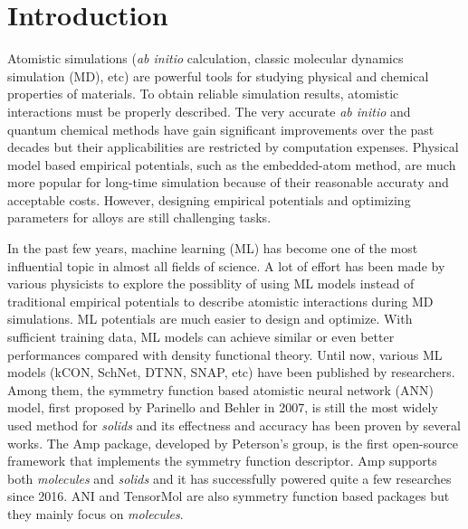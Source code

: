 \documentclass[prb,preprint]{revtex4-2}
\begin{document}
% 
%
\newpage

\section{Introduction}

Atomistic simulations (\textit{ab initio} calculation, classic molecular 
dynamics simulation (MD), etc) are powerful tools for studying physical and 
chemical properties of materials. To obtain reliable simulation results, 
atomistic interactions must be properly described. The very accurate 
\textit{ab initio} and quantum chemical methods have gain significant 
improvements over the past decades but their applicabilities are restricted by 
computation expenses. Physical model based empirical potentials, such as the 
embedded-atom method\cite{eam-1,eam-2,eam-3,eam-4,eam-5}, are much more popular 
for long-time simulation because of their reasonable accuraty and acceptable 
costs. However, designing empirical potentials and optimizing parameters for 
alloys are still challenging tasks. 

In the past few years, machine learning (ML) has become one of the most 
influential topic in almost all fields of science. A lot of effort has been made 
by various physicists to explore the possiblity of using ML models \textemdash 
instead of traditional empirical potentials \textemdash to describe atomistic 
interactions during MD simulations. ML potentials are much easier to design and 
optimize. With sufficient training data, ML models can achieve similar or even 
better performances compared with density functional theory. Until now, various 
ML models (kCON\cite{kCON}, SchNet\cite{SchNet}, DTNN\cite{DTNN}, 
SNAP\cite{SNAP_Mo_2017, SNAP_2018}, etc) have been published by researchers. 
Among them, the symmetry function based atomistic neural network (ANN) model, 
first proposed by Parinello and Behler in 
2007\cite{Behler,Behler2,Behler3,Behler4,Behler1}, is still the most widely used 
method for \textit{solids} and its effectness and accuracy has been proven by 
several works\cite{Behler-solids-lzp-1,Behler-alloy-1,Behler-alloy-2,
Behler-alloy-3}. The Amp\cite{AMP} package, developed by Peterson's group, is 
the first open-source framework that implements the symmetry function 
descriptor. Amp supports both \textit{molecules} and \textit{solids} and it has 
successfully powered quite a few researches since 
2016\cite{Amp-works-hammer,amp-work-1}. ANI\cite{ANI} and 
TensorMol\cite{TensorMol} are also symmetry function based packages but they 
mainly focus on \textit{molecules}.
\end{document}
